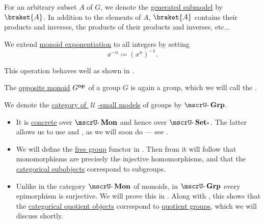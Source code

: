 \begin{definition}
\begin{thmenum}
     For an arbitrary subset \( A \) of \( G \), we denote the \hyperref[def:first_order_generated_substructure]{generated submodel} by \( \braket{ A } \). In addition to the elements of \( A \), \( \braket{ A } \) contains their products and inverses, the products of their products and inverses, etc...

     We extend \hyperref[def:monoid/exponentiation]{monoid exponentiation} to all integers by setting
    \begin{equation*}
      x^{-n} \coloneqq (x^n)^{-1}.
    \end{equation*}

    This operation behaves well as shown in .

     The \hyperref[def:monoid/opposite]{opposite monoid} \( G^\oppos \) of a group \( G \) is again a group, which we will call the .

     We denote the \hyperref[def:category_of_small_first_order_models]{category of \( \mscrU \)-small models} of groups by \( \ucat{Grp} \).

    \begin{itemize}
      \item It is \hyperref[def:concrete_category]{concrete} over \hyperref[def:monoid/category]{\( \ucat{Mon} \)} and hence over \hyperref[def:pointed_set/category]{\( \ucat{Set_*} \)}. The latter allows us to use  and , as we will soon do --- see .

      \item We will define the \hyperref[def:free_group]{free group} functor in . Then from  it will follow that monomorphisms are precisely the injective homomorphisms, and that the \hyperref[def:subobject_and_quotient]{categorical subobjects} correspond to subgroups.

      \item Unlike in the category \hyperref[def:monoid/category]{\( \ucat{Mon} \)} of monoids, in \( \ucat{Grp} \) every epimorphism is surjective. We will prove this in . Along with , this shows that the \hyperref[def:subobject_and_quotient]{categorical quotient objects} correspond to \hyperref[def:group/quotient]{quotient groups}, which we will discuss shortly.


\end{itemize}
\end{thmenum}
\end{definition}
